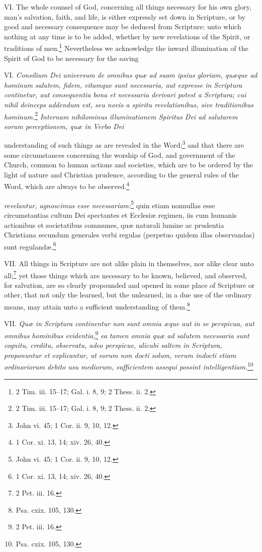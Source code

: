 VI. The whole counsel of God, concerning all things necessary for his own glory, man's salvation, faith, and life, is either expressly set down in Scripture, or by good and necessary consequence may be deduced from Scripture: unto which nothing at any time is to be added, whether by new revelations of the Spirit, or traditions of men.\footnote{2 Tim. iii. 15–17; Gal. i. 8, 9;  2 Thess. ii. 2.} Nevertheless we acknowledge the inward illumination of the Spirit of God to be necessary for the saving

VI. \emph{Consilium Dei universum de omnibus quæ ad suam ipsius gloriam, quæque ad hominum salutem, fidem, vitamque sunt necessaria, aut expresse in Scriptura continetur, aut consequentia bona et necessaria derivari potest a Scriptura; cui nihil deinceps addendum est, seu novis a spiritu revelationibus, sive traditionibus hominum.}\footnote{2 Tim. iii. 15–17; Gal. i. 8, 9;  2 Thess. ii. 2.}\emph{ Internam nihilominus illuminationem Spiritus Dei ad salutarem eorum perceptionem, quæ in Verbo Dei }

understanding of such things as are revealed in the Word;\footnote{John vi. 45;  1 Cor. ii. 9, 10, 12.} and that there are some circumstances concerning the worship of God, and government of the Church, common to human actions and societies, which are to be ordered by the light of nature and Christian prudence, according to the general rules of the Word, which are always to be observed.\footnote{1 Cor. xi. 13, 14; xiv. 26, 40.}

\emph{revelantur, agnoscimus esse necessariam:}\footnote{John vi. 45; 1 Cor. ii. 9, 10, 12.} quin etiam nonnullas esse circumstantias cultum Dei spectantes et Ecclesiæ regimen, iis cum humanis actionibus et societatibus communes, quæ naturali lumine ac prudentia Christiana secundum generales verbi regulas (perpetuo quidem illas observandas) sunt regulandæ.\footnote{1 Cor. xi. 13, 14; xiv. 26, 40.}

VII. All things in Scripture are not alike plain in themselves, nor alike clear unto all;\footnote{2 Pet. iii. 16.} yet those things which are necessary to be known, believed, and observed, for salvation, are so clearly propounded and opened in some place of Scripture or other, that not only the learned, but the unlearned, in a due use of the ordinary means, may attain unto a sufficient understanding of them.\footnote{Psa. cxix. 105, 130.}

VII. \emph{Quæ in Scriptura continentur non sunt omnia æque aut in se perspicua, aut omnibus hominibus evidentia,}\footnote{2 Pet. iii. 16.}\emph{ ea tamen omnia quæ ad salutem necessaria sunt cognitu, creditu, observatu, adeo perspicue, alicubi saltem in Scriptura, proponuntur et explicantur, ut eorum non docti solum, verum indocti etiam ordinariorum debito usu mediorum, sufficientem assequi possint intelligentiam.}\footnote{Psa. cxix. 105, 130.}

